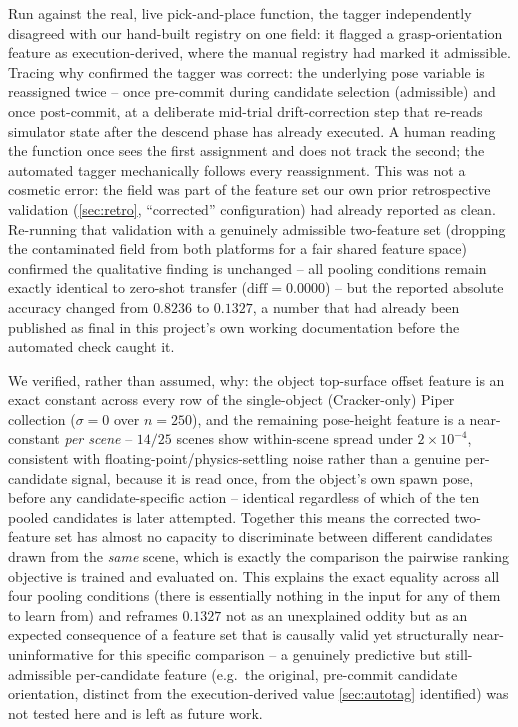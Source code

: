 \documentclass[journal]{IEEEtran}
\begin{document}
Run against the real, live pick-and-place function, the tagger
independently disagreed with our hand-built registry on one field: it
flagged a grasp-orientation feature as execution-derived, where the
manual registry had marked it admissible. Tracing why confirmed the
tagger was correct: the underlying pose variable is reassigned twice --
once pre-commit during candidate selection (admissible) and once
post-commit, at a deliberate mid-trial drift-correction step that
re-reads simulator state after the descend phase has already executed. A
human reading the function once sees the first assignment and does not
track the second; the automated tagger mechanically follows every
reassignment. This was not a cosmetic error: the field was part of the
feature set our own prior retrospective validation
(\cref{sec:retro}, ``corrected'' configuration) had already reported as
clean. Re-running that validation with a genuinely admissible two-feature
set (dropping the contaminated field from both platforms for a fair
shared feature space) confirmed the qualitative finding is unchanged --
all pooling conditions remain exactly identical to zero-shot transfer
($\mathrm{diff}=0.0000$) -- but the reported absolute accuracy changed
from $0.8236$ to $0.1327$, a number that had already been published as
final in this project's own working documentation before the automated
check caught it.

We verified, rather than assumed, why: the object top-surface offset
feature is an exact constant across every row of the single-object
(Cracker-only) Piper collection ($\sigma{=}0$ over $n{=}250$), and the
remaining pose-height feature is a near-constant \emph{per scene} --
$14/25$ scenes show within-scene spread under $2{\times}10^{-4}$,
consistent with floating-point/physics-settling noise rather than a
genuine per-candidate signal, because it is read once, from the object's
own spawn pose, before any candidate-specific action -- identical
regardless of which of the ten pooled candidates is later attempted.
Together this means the corrected two-feature set has almost no capacity
to discriminate between different candidates drawn from the \emph{same}
scene, which is exactly the comparison the pairwise ranking objective is
trained and evaluated on. This explains the exact equality across all
four pooling conditions (there is essentially nothing in the input for
any of them to learn from) and reframes $0.1327$ not as an unexplained
oddity but as an expected consequence of a feature set that is causally
valid yet structurally near-uninformative for this specific comparison --
a genuinely predictive but still-admissible per-candidate feature (e.g.\
the original, pre-commit candidate orientation, distinct from the
execution-derived value \cref{sec:autotag} identified) was not tested
here and is left as future work.
\end{document}
